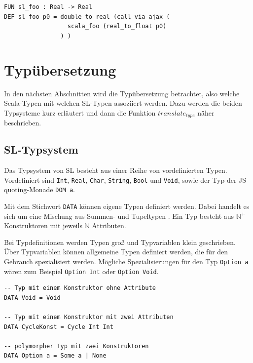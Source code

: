\documentclass[12pt,bibtotoc]{scrreprt}
\begin{document}
\begin{lstlisting}[caption=Übersetzung von scala\_foo, label=lst:scala-fun-example-translate]
FUN sl_foo : Real -> Real
DEF sl_foo p0 = double_to_real (call_via_ajax (
                  scala_foo (real_to_float p0) 
                ) )
\end{lstlisting}

\section{Typübersetzung}
\label{sec:type-translation}

In den nächsten Abschnitten wird die Typübersetzung betrachtet, also welche Scala-Typen mit welchen SL-Typen assoziiert werden. Dazu werden die beiden Typsysteme kurz erläutert und dann die Funktion $translate_{type}$ näher beschrieben.

\subsection{SL-Typsystem}
\label{subsec:sl-typesystem}

Das Typsystem von SL besteht aus einer Reihe von vordefinierten Typen. Vordefiniert sind \lstinline!Int!, \lstinline!Real!, \lstinline!Char!, \lstinline!String!, \lstinline!Bool! und \lstinline!Void!, sowie der Typ der JS-quoting-Monade \lstinline!DOM a!.

Mit dem Stichwort \lstinline!DATA! können eigene Typen definiert werden. Dabei handelt es sich um eine Mischung aus Summen- und Tupeltypen \cite[S.119f u. S. 123]{Pepper2007}. Ein Typ besteht aus $\mathbb{N}^+$ Konstruktoren mit jeweils $\mathbb{N}$ Attributen.

Bei Typdefinitionen werden Typen groß und Typvariablen klein geschrieben. Über Typvariablen können allgemeine Typen definiert werden, die für den Gebrauch spezialisiert werden. Mögliche Spezialisierungen für den Typ \lstinline!Option a! wären zum Beispiel \lstinline!Option Int! oder \lstinline!Option Void!.

\begin{lstlisting}[caption=Beispiele für selbst definierte Datentypen in SL, label=lst:bsp2]
-- Typ mit einem Konstruktor ohne Attribute
DATA Void = Void

-- Typ mit einem Konstruktor mit zwei Attributen
DATA CycleKonst = Cycle Int Int

-- polymorpher Typ mit zwei Konstruktoren 
DATA Option a = Some a | None
\end{lstlisting}
\end{document}

